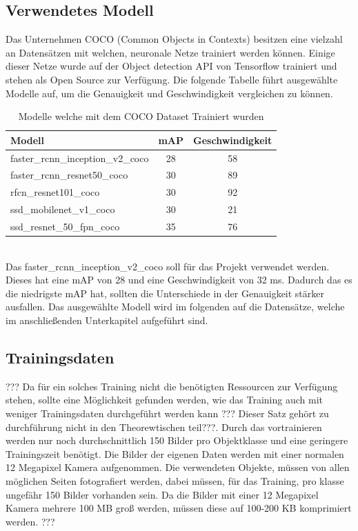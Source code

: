 \documentclass[a4paper,12pt,oneside]{article}
\begin{document}
 \subsection{Verwendetes Modell}\label{s.modell}
Das Unternehmen COCO \cite{common2018data} (Common Objects in Contexts) besitzen eine vielzahl an Datensätzen mit welchen, neuronale Netze trainiert werden können. Einige dieser Netze wurde auf der Object detection API von Tensorflow trainiert und stehen als Open Source zur Verfügung. Die folgende Tabelle führt ausgewählte Modelle auf, um die Genauigkeit und Geschwindigkeit vergleichen zu können.\\
\begin{table}
[h]
\caption{Modelle \cite{google2018tens} welche mit dem COCO Dataset Trainiert wurden \cite{common2018data}}
\centering
\begin{tabular}{|l|c|c|}
\hline
Modell & mAP & Geschwindigkeit\\
\hline
faster\_rcnn\_inception\_v2\_coco & 28 & 58\\
faster\_rcnn\_resnet50\_coco & 30 & 89\\
rfcn\_resnet101\_coco & 30 & 92\\
ssd\_mobilenet\_v1\_coco & 30 & 21\\
ssd\_resnet\_50\_fpn\_coco & 35 & 76\\
\hline
\end{tabular}
\end{table}\\
Das faster\_rcnn\_inception\_v2\_coco soll für das Projekt verwendet werden. Dieses hat eine mAP von 28 und eine Geschwindigkeit von 32 ms. Dadurch das es die niedrigste mAP hat, sollten die Unterschiede in der Genauigkeit stärker ausfallen. Das ausgewählte Modell wird im folgenden auf die Datensätze, welche im anschließenden Unterkapitel aufgeführt sind.
  \subsection{Trainingsdaten}\label{s.tdaten}
  ??? Da für ein solches Training nicht die benötigten Ressourcen zur Verfügung stehen, sollte eine Möglichkeit gefunden werden, wie das Training auch mit weniger Trainingsdaten durchgeführt werden kann ??? Dieser Satz gehört zu durchführung nicht in den Theorewtischen teil???. Durch das vortrainieren werden nur noch durchschnittlich 150 Bilder pro Objektklasse und eine geringere Trainingszeit benötigt. Die Bilder der eigenen Daten werden mit einer normalen 12 Megapixel Kamera aufgenommen. Die verwendeten Objekte, müssen von allen möglichen Seiten fotografiert werden, dabei müssen, für das Training, pro klasse ungefähr 150 Bilder vorhanden sein. Da die Bilder mit einer 12 Megapixel Kamera mehrere 100 MB groß werden, müssen diese auf 100-200 KB komprimiert werden. ???\\
\end{document}
